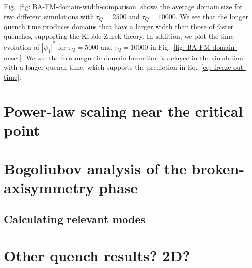 Fig.~\ref{fig: BA-FM-domain-width-comparison} shows the average domain size
for two different simulations with $\tau_Q=2500$ and $\tau_Q=10000$.
We see that the longer quench time produces domains that have a
larger width than those of faster quenches, supporting the Kibble-Zurek theory.
In addition, we plot the time evolution of $|\psi_1|^2$ for $\tau_Q=5000$ and
$\tau_Q=10000$ in Fig.~\ref{fig: BA-FM-domain-onset}.
We see the ferromagnetic domain formation is delayed in the simulation
with a longer quench time, which supports the prediction in
Eq.~\eqref{eq: freeze-out-time}.

\section{Power-law scaling near the critical point}

\section{Bogoliubov analysis of the broken-axisymmetry phase}
\subsection{Calculating relevant modes}

\section{Other quench results? 2D?}
